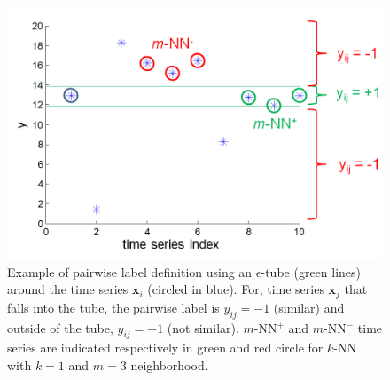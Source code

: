 \begin{figure}[h!]
	\centering
	\includegraphics[width=0.55\linewidth]{images/pairwise_label_tube2}
	\caption[Example of pairwise label definition using an $\epsilon$-tube (green lines) around the time series $\textbf{x}_i$ (circled in blue).]{Example of pairwise label definition using an $\epsilon$-tube (green lines) around the time series $\textbf{x}_i$ (circled in blue). For, time series $\textbf{x}_j$ that falls into the tube, the pairwise label is $y_{ij} = -1$ (similar) and outside of the tube, $y_{ij} = +1$ (not similar). $m$-NN$^+$ and $m$-NN$^-$ time series are indicated respectively in green and red circle for $k$-NN with $k=1$ and $m=3$ neighborhood.}
	\label{fig:pairwise_label_tube}
\end{figure}


